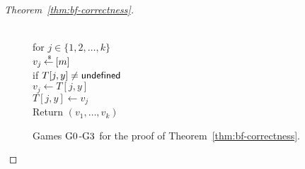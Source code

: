 \begin{proof}[Theorem~\ref{thm:bf-correctness}]
\begin{figure}[tp]
{{\\
for $j \in \{1,2,\ldots,k\}$\\
\nudge $v_j \getsr [m]$\\
\nudge if $T[j,y] \neq \undefined$\\
\nudge \nudge $v_j \gets T[j,y]$\\
\nudge $T[j,y] \gets v_j$\\
Return $\left(v_1,\ldots,v_k\right)$
}
}
\caption{Games $\text{G0}$-$\text{G3}$ for the
proof of Theorem~\ref{thm:bf-correctness}.}
\label{fig:bf-correctness-games1}
\end{figure}
\begin{figure}[tp]
\fpage{.9}{
\hpagessl{.45}{.5}
{
\underline{$\game{4}(A)$} \\ %
$S \getsr A$; $\err \gets 0$;  $\calC \gets \emptyset$\\
$(\pubaux,\privaux) \getsr \Rep^{\HashOracle}(S)$\\
$\bot \getsr A^{\TestOracle,\HashOracle}(\pubaux)$\\
if $\err  < r$ then Return 0\\
Return 1\\
%
\oracle{$\TestOracle(\qry_x)$}\\
if $x \in \mathcal{C}$ then Return $\bot$\\
$\calC \gets \calC \cup x$\\
if $\Ans[x] = \undefined$\\
\nudge $(h_1, \ldots, h_{k}) \gets \HashOracle(\qry_x)$\\
Return $\Ans[x]$\\
%
}
{
\oracle{$\HashOracle(\qry_y)$}\\
for $j \in \{1,2,\ldots,k\}$\\
\nudge $v_j \getsr [m]$\\
\nudge if $T[j,y] \neq \undefined$\\
\nudge \nudge $v_j \gets T[j,y]$\\
\nudge $T[j,y] \gets v_j$\\
%
$M \gets\pubaux$\\
}}
\end{figure}
\end{proof}
